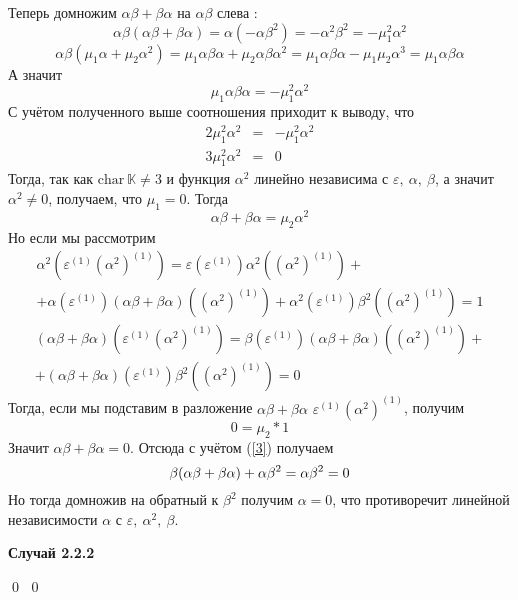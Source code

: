 \documentclass[12pt, reqno, a4paper, oneside, notitlepage]{amsart}
\makeatletter
\theoremstyle{mytheoremstyle}
\theoremstyle{myremarkstyle}
\numberwithin{equation}{section}
\renewenvironment{proof}[1][\proofname]{\par\indent {\bfseries #1\@addpunct{.} }}{\qed}
\makeatother
\begin{document}
\begin{proof}
\begin{proof}
    Теперь домножим $\alpha\beta+\beta\alpha$ на $\alpha\beta$ слева :
    \[
        \alpha\beta(\alpha\beta+\beta\alpha) = \alpha(-\alpha\beta^2) = -\alpha^2\beta^2 = -\mu_1^2\alpha^2
    \]
    \[
        \alpha\beta(\mu_1\alpha+\mu_2\alpha^2) = \mu_1\alpha\beta\alpha+\mu_2\alpha\beta\alpha^2=\mu_1\alpha\beta\alpha-\mu_1\mu_2\alpha^3 = \mu_1\alpha\beta\alpha
    \]
    А значит \[
    \mu_1\alpha\beta\alpha = -\mu_1^2\alpha^2
    \]
    С учётом полученного выше соотношения приходит к выводу, что 
    \begin{eqnarray*}
        2\mu_1^2\alpha^2 &=& -\mu_1^2\alpha^2\\
        3\mu_1^2\alpha^2 &=& 0
    \end{eqnarray*}
    Тогда, так как $\mathrm{char}\ \mathbb{K} \neq 3$ и функция $\alpha^2$ линейно независима с $\varepsilon,\ \alpha,\ \beta$, а значит $\alpha^2 \neq 0$, получаем, что $\mu_1 =0 $.
    Тогда \[
    \alpha\beta+\beta\alpha = \mu_2\alpha^2
    \]
    Но если мы рассмотрим
    \begin{multline*}
        \alpha^2 \left(\varepsilon^{(1)}\left(\alpha^2\right)^{(1)} \right) = \varepsilon(\varepsilon^{(1)})\alpha^2 \left(\left(\alpha^2\right)^{(1)}\right) +
        \\
        +\alpha(\varepsilon^{(1)})(\alpha\beta+\beta\alpha)\left(\left(\alpha^2\right)^{(1)}\right) + \alpha^2(\varepsilon^{(1)}) \beta^2 \left(\left(\alpha^2\right)^{(1)}\right) = 1
    \end{multline*}
    \begin{multline*}
        (\alpha\beta+\beta\alpha)\left(\varepsilon^{(1)}\left(\alpha^2\right)^{(1)} \right) = \beta(\varepsilon^{(1)})(\alpha\beta+\beta\alpha)\left(\left(\alpha^2\right)^{(1)}\right)+
        \\
        +(\alpha\beta+\beta\alpha)(\varepsilon^{(1)})\beta^2\left(\left(\alpha^2\right)^{(1)}\right) = 0
    \end{multline*}
    Тогда, если мы подставим в разложение $\alpha\beta+\beta\alpha$ $\varepsilon^{(1)}\left(\alpha^2\right)^{(1)}$, получим \[
    0 = \mu_2*1
    \]
    Значит $\alpha\beta+\beta\alpha = 0$. Отсюда с учётом (\ref{3}) получаем 
    \[
        \beta(\alpha\beta+\beta\alpha)+\alpha\beta^2 = \alpha\beta^2 = 0\\
    \]
    Но тогда домножив на обратный к $\beta^2$ получим $\alpha =0$, что противоречит линейной независимости $\alpha$ с $\varepsilon,\ \alpha^2,\ \beta$.
    
    \textbf{Случай 2.2.2}


\end{proof}
\end{proof}
\end{document}

